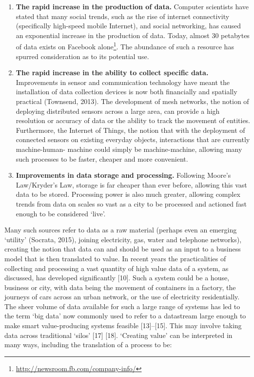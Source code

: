 \documentclass[journal]{IEEEtran}
\begin{document}
\begin{enumerate}
\item {\textbf{The rapid increase in the production of data.}}
Computer scientists have stated that many social trends, such as the
rise of internet connectivity (specifically high-speed mobile
Internet), and social networking, has caused an exponential increase
in the production of data. Today, almost 30 petabytes of data exists
on Facebook
alone\footnote{\url{http://newsroom.fb.com/company-info/}}. The
abundance of such a resource has spurred consideration as to its
potential use.
\item {\textbf{The rapid increase in the ability to collect specific
data.}} Improvements in sensor and communication technology have meant
the installation of data collection devices is now both financially
and spatially practical (Townsend, 2013). The development of mesh
networks, the notion of deploying distributed sensors across a large
area, can provide a high resolution or accuracy of data or the ability
to track the movement of entities. Furthermore, the Internet of
Things, the notion that with the deployment of connected sensors on
existing everyday objects, interactions that are currently
machine-human- machine could simply be machine-machine, allowing many
such processes to be faster, cheaper and more convenient.
\item {\textbf{Improvements in data storage and processing.}}
Following Moore's Law/Kryder's Law, storage is far cheaper than ever
before, allowing this vast data to be stored. Processing power is also
much greater, allowing complex trends from data on scales so vast as a
city to be processed and actioned fast enough to be considered `live'.
\end{enumerate}

Many such sources refer to data as a raw material (perhaps even an
emerging `utility' (Socrata, 2015), joining electricity, gas, water
and telephone networks), creating the notion that data can and should
be used as an input to a business model that is then translated to
value. In recent years the practicalities of collecting and processing
a vast quantity of high value data of a system, as discussed, has
developed significantly [10]. Such a system could be a house, business
or city, with data being the movement of containers in a factory, the
journeys of cars across an urban network, or the use of electricity
residentially. The sheer volume of data available for such a large
range of systems has led to the term `big data' now commonly used to
refer to a datastream large enough to make smart value-producing
systems feasible [13]–[15]. This may involve taking data across
traditional `silos' [17] [18]. `Creating value' can be interpreted in
many ways, including the translation of a process to be:
\end{document}
